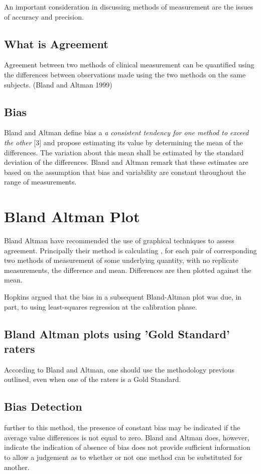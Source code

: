 \documentclass[12pt, a4paper]{report}
\begin{document}
An important consideration in discussing methods of measurement are the issues of accuracy and precision.

\subsection{What is Agreement}

Agreement between two methods of clinical measurement can be quantified using the differences between observations made using the two methods on the same subjects. (Bland and Altman 1999)




\subsection{Bias}
Bland and Altman define bias a \emph{a consistent tendency for one
method to exceed the other} [$3$] and propose estimating its value
by determining the mean of the differences. The variation about
this mean shall be estimated by the  standard deviation of the
differences. Bland and Altman remark that these estimates are based on the
assumption that bias and variability are constant throughout the
range of measurements.

\section{Bland Altman Plot} Bland Altman have
recommended the use of graphical techniques to assess agreement.
Principally their method is calculating , for each pair of
corresponding two methods of measurement of some underlying
quantity, with no replicate measurements, the difference and mean.
Differences are then plotted against the mean.

Hopkins argued that the bias in a subsequent Bland-Altman plot was
due, in part, to using least-squares regression at the calibration
phase.

\subsection{Bland Altman plots using 'Gold Standard' raters}
According to Bland and Altman, one should use the methodology
previous outlined, even when one of the raters is a Gold Standard.


\subsection{Bias Detection}
further to this method, the presence of constant bias may be
indicated if the average value differences is not equal to zero.
Bland and Altman does, however, indicate the indication of absence
of bias does not provide sufficient information to allow a
judgement as to whether or not one method can be substituted for
another.



\end{document}
